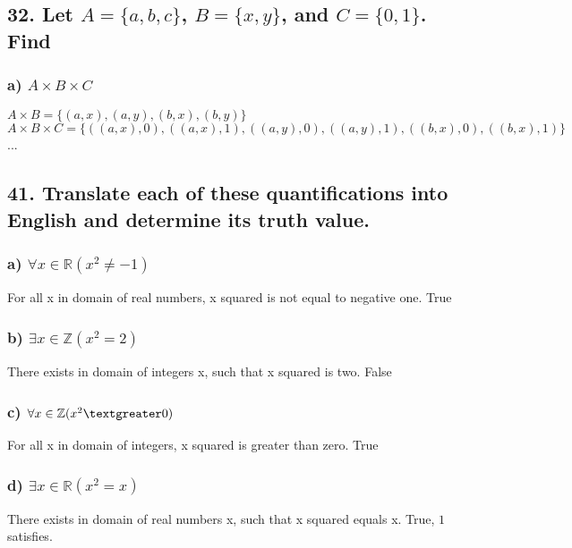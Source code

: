 \documentclass[11pt, oneside]{article} %
\numberwithin{equation}{section} %
\numberwithin{figure}{section} %
\numberwithin{table}{section} %
\begin{document}
\subsection{32. Let $A = \{a,b,c\}$, $B = \{x,y\}$, and $C = \{0,1\}$. Find}
\subsubsection{a) $A \times B \times C$}
$A \times B = \{ (a, x), (a, y), (b, x), (b, y) \}$ \\
$A \times B \times C = \{ ((a, x), 0), ((a, x), 1), ((a, y), 0), ((a, y), 1), ((b, x), 0), ((b, x), 1) \}$\\
...

\subsection{41. Translate each of these quantifications into English and determine its truth value.}
\subsubsection{a) $\forall x \in \mathbb{R} (x^2 \neq -1)$}
For all x in domain of real numbers, x squared is not equal to negative one. True
\subsubsection{b) $\exists x \in \mathbb{Z} (x^2 = 2)$}
There exists in domain of integers x, such that x squared is two. False
\subsubsection{c) $\forall x \in \mathbb{Z} (x^2 \textgreater 0)$}
For all x in domain of integers, x squared is greater than zero. True
\subsubsection{d) $\exists x \in \mathbb{R} (x^2 = x)$}
There exists in domain of real numbers x, such that x squared equals x. True, $1$ satisfies.
\end{document}
